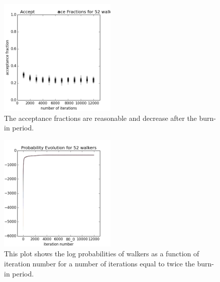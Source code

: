 \documentclass[preprint]{aastex}
\begin{document}
\begin{figure}
\includegraphics[width=0.5\textwidth]{fracs-toy.png}
\caption{The acceptance fractions are reasonable and decrease after the burn-in 
period.}
\label{fig:dumbestfrac}
\end{figure}

\begin{figure}
\includegraphics[width=0.5\textwidth]{probs-toy.png}
\caption{This plot shows the log probabilities of walkers as a function of 
iteration number for a number of iterations equal to twice the burn-in period.}
\label{fig:dumbestprob}
\end{figure}
\end{document}
